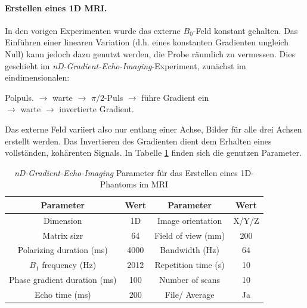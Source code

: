 \documentclass[../main.tex]{subfiles}
\begin{document}
    \paragraph{Erstellen eines 1D MRI.}
        In den vorigen Experimenten wurde das externe $B_0$-Feld konstant gehalten. Das Einführen einer linearen Variation (d.h. eines konstanten Gradienten ungleich Null) kann jedoch dazu genutzt werden, die Probe räumlich zu vermessen. Dies geschieht im \textit{nD-Gradient-Echo-Imaging}-Experiment, zunächst im eindimensionalen:
        \begin{center}
            Polpuls. $\longrightarrow$ warte $\longrightarrow$ $\pi/2$-Puls $\longrightarrow$ führe Gradient ein\\
            $\longrightarrow$ warte $\longrightarrow$ invertierte Gradient.
        \end{center}
        Das externe Feld variiert also nur entlang einer Achse, Bilder für alle drei Achsen erstellt werden. Das Invertieren des Gradienten dient dem Erhalten eines vollständen, kohärenten Signals. In Tabelle \ref{tab:DurchfuehrungTeil12Parameter} finden sich die genutzen Parameter.

        \begin{table}[H]
            \centering
            \begin{tabular}{cc|cc}
                \textbf{Parameter} & \textbf{Wert} & \textbf{Parameter} & \textbf{Wert}  \\\hline\hline
                Dimension & 1D & Image orientation & X/Y/Z\\\hline 
                Matrix sizr & 64 & Field of view (\si{\milli\metre}) & 200\\\hline
                Polarizing duration (\si{\milli\second}) & 4000 & Bandwidth (\si{\hertz}) & 64\\\hline
                $B_1$ frequency (\si{\hertz}) & 2012 & Repetition time (\si{\second}) & 10\\\hline
                Phase gradient duration (\si{\milli\second}) & 100 & Number of scans & 10\\\hline
                Echo time (\si{\milli\second}) & 200 & File/ Average & Ja
            \end{tabular}
            \caption{\textit{nD-Gradient-Echo-Imaging} Parameter für das Erstellen eines 1D-Phantoms im MRI}
            \label{tab:DurchfuehrungTeil12Parameter}
        \end{table}
\end{document}
